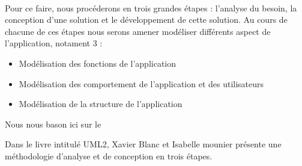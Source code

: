 			\paragraph{}%
			Pour ce faire, nous procéderons en trois grandes étapes : l'analyse du
			besoin, la conception d'une solution et le développement de cette
			solution. Au cours de chacune de ces étapes nous serons amener  modéliser
			différents aspect de l'application, notament 3 :
			\begin{itemize}
			  \item Modélisation des fonctions de l'application
			  \item Modélisation des comportement de l'application et des utilisateurs
			  \item Modélisation de la structure de l'application
			\end{itemize}
			Nous nous bason ici sur le
			
			Dans le livre intitulé UML2, Xavier Blanc et Isabelle mounier présente une
			méthodologie d'analyse et de conception en trois étapes.
			
			\paragraph{}%
			
			
			
			